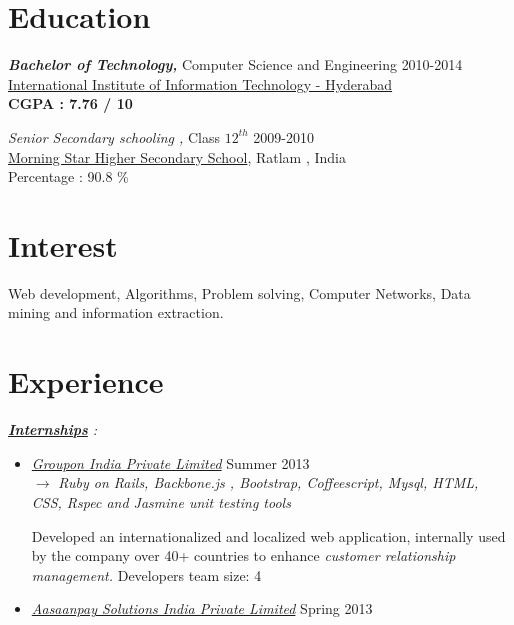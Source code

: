 \documentclass[margin]{res}
\begin{document}
\begin{resume}
 
\section{Education} {\sl \bf Bachelor of Technology,} Computer Science and Engineering    \hfill{2010-2014}\\
		  \hypersetup{urlcolor=black}          
          \href{http://www.iiit.ac.in/}{International Institute of Information Technology - Hyderabad} \\
		  \hypersetup{urlcolor=blue}
          {\bf CGPA : 7.76 / 10}
                 
          {\sl Senior Secondary schooling ,} Class ${12}^{th}$   \hfill{2009-2010} \\
		  \hypersetup{urlcolor=black}          
          \href{http://www.morningstarratlam.com/home_morningstarschool.htm}{Morning Star Higher Secondary School}, Ratlam , India \\
          \hypersetup{urlcolor=blue}
          Percentage : 90.8 \% 


\section{Interest} { Web development, Algorithms, Problem solving, Computer Networks, Data mining and information extraction. }


\section{Experience}
{\sl \underline{\bf Internships} : }
\begin{itemize}
\item
 \hypersetup{urlcolor=black}
 {\it \href{http://www.linkedin.com/company/groupon-india}{Groupon India Private Limited}} \hfill{Summer 2013} \\
 \hypersetup{urlcolor=blue}
$\rightarrow$ {\it Ruby on Rails, Backbone.js , Bootstrap, Coffeescript, Mysql, HTML, CSS, Rspec and Jasmine unit testing tools } 

 Developed an internationalized and localized web application, internally used by the company over 40+ countries to enhance {\it customer relationship management.} \hfill{Developers team size: 4} 
\item
\hypersetup{urlcolor=black}
{\it \href{http://www.linkedin.com/company/3049433}{Aasaanpay Solutions India Private Limited}}  \hfill{Spring 2013} 


\end{itemize}
\end{resume}
\end{document}
